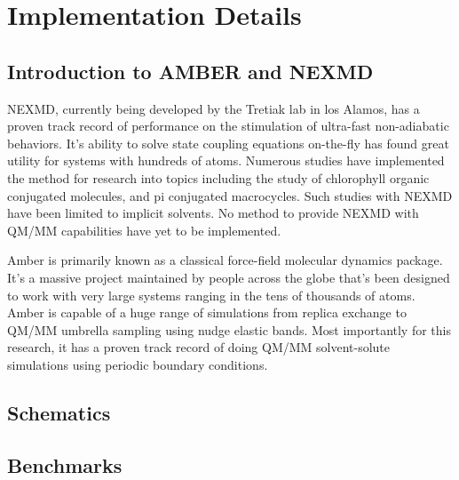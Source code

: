 \chapter{Implementation Details} \label{implementationDetails}

\section{Introduction to AMBER and NEXMD}

NEXMD, currently being developed by the Tretiak lab in los Alamos, has a proven track record of performance on the stimulation of ultra-fast non-adiabatic behaviors.
It’s ability to solve state coupling equations on-the-fly has found great utility for systems with hundreds of atoms.
Numerous studies have implemented the method for research into topics including the study of chlorophyll organic conjugated molecules, and pi conjugated macrocycles. \cite{zheng2017photoinduced, nelson2014nonadiabatic, alfonso2016interference} 
Such studies with NEXMD have been limited to implicit solvents.
No method to provide NEXMD with QM/MM capabilities have yet to be implemented.

Amber is primarily known as a classical force-field molecular dynamics package.
It’s a massive project maintained by people across the globe that's been designed to work with very large systems ranging in the tens of thousands of atoms. \cite{case2020a}
Amber is capable of a huge range of simulations from replica exchange to QM/MM umbrella sampling using nudge elastic bands. \cite{cruzeiro2020exploring, ghoreishi2019fast}
Most importantly for this research, it has a proven track record of doing QM/MM solvent-solute simulations using periodic boundary conditions.

\section{Schematics}

\section{Benchmarks}
